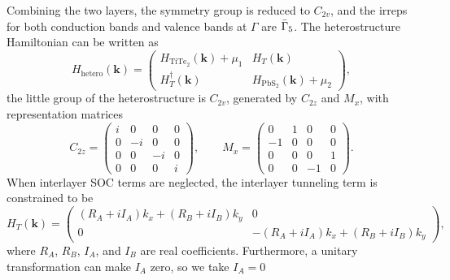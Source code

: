 \documentclass[aps, preprint, prb,]{revtex4-2}
\begin{document}
Combining the two layers, the symmetry group is reduced to $C_{2v}$, and the irreps for both conduction bands and valence bands at $\Gamma$ are $\Bar{\Gamma}_5$. The heterostructure Hamiltonian can be written as
\begin{equation}
H_{\mathrm{hetero}}(\mathbf{k})=
\begin{pmatrix}
H_{\mathrm{TiTe}_2}(\mathbf{k})+\mu_1 & H_T(\mathbf{k})\\
H_T^\dagger(\mathbf{k}) & H_{\mathrm{PbS}_2}(\mathbf{k})+\mu_2
\end{pmatrix},
\end{equation}
the little group of the heterostructure is $C_{2v}$, generated by $C_{2z}$ and $M_x$, with representation matrices
\begin{equation}
C_{2z}=
\begin{pmatrix}
i & 0 & 0 & 0\\
0 & -i & 0 & 0\\
0 & 0 & -i & 0\\
0 & 0 & 0 & i
\end{pmatrix},
\qquad
M_x=
\begin{pmatrix}
0 & 1 & 0 & 0\\
-1 & 0 & 0 & 0\\
0 & 0 & 0 & 1\\
0 & 0 & -1 & 0
\end{pmatrix}.
\end{equation}
When interlayer SOC terms are neglected, the interlayer tunneling term is constrained to be
\begin{equation}
H_T(\mathbf{k})=
\begin{pmatrix}
(R_A+iI_A) k_x + (R_B+iI_B)k_y & 0\\
0 & -(R_A+iI_A) k_x + (R_B+iI_B)k_y
\end{pmatrix},
\end{equation}
where $R_A$, $R_B$, $I_A$, and $I_B$ are real coefficients. Furthermore, a unitary transformation can make $I_A$ zero, so we take $I_A=0$
\end{document}
